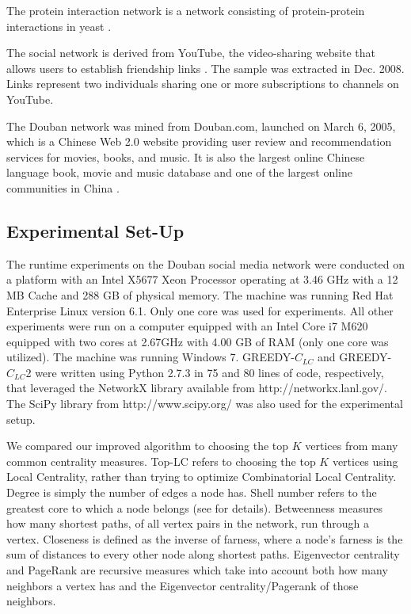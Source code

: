The protein interaction network is a network consisting of protein-protein interactions in yeast \cite{ccnr}.  

The social network is derived from YouTube, the video-sharing website that allows users to establish friendship links \cite{abc}. The sample was extracted in Dec. 2008. Links represent two individuals sharing one or more subscriptions to channels on YouTube.

The Douban network was mined from Douban.com, launched on March 6, 2005, which is a Chinese Web 2.0 website providing user review and recommendation services for movies, books, and music. It is also the largest online Chinese language book, movie and music database and one of the largest online communities in China \cite{douban}.

\subsection{Experimental Set-Up}
The runtime experiments on the Douban social media network were conducted on a platform with an Intel X5677 Xeon Processor operating at 3.46 GHz with a 12 MB Cache and 288 GB of physical memory.  The machine was running Red Hat Enterprise Linux version 6.1.  Only one core was used for experiments.  All other experiments were run on a computer equipped with an Intel Core i7 M620 equipped with two cores at 2.67GHz with 4.00 GB of RAM (only one core was utilized). The machine was running Windows 7.  GREEDY-$C_{LC}$ and GREEDY-$C_{LC}$2 were written using Python 2.7.3 in 75 and 80 lines of code, respectively, that leveraged the NetworkX library available from http://networkx.lanl.gov/. The SciPy library from http://www.scipy.org/ was also used for the experimental setup.

We compared our improved algorithm to choosing the top $K$ vertices from many common centrality measures. Top-LC refers to choosing the top $K$ vertices using Local Centrality, rather than trying to optimize Combinatorial Local Centrality.  Degree is simply the number of edges a node has.  Shell number refers to the greatest core to which a node belongs (see \cite{kitsak10} for details).  Betweenness measures how many shortest paths, of all vertex pairs in the network, run through a vertex.  Closeness is defined as the inverse of farness, where a node's farness is the sum of distances to every other node along shortest paths.  Eigenvector centrality and PageRank are recursive measures which take into account both how many neighbors a vertex has and the Eigenvector centrality/Pagerank of those neighbors.

